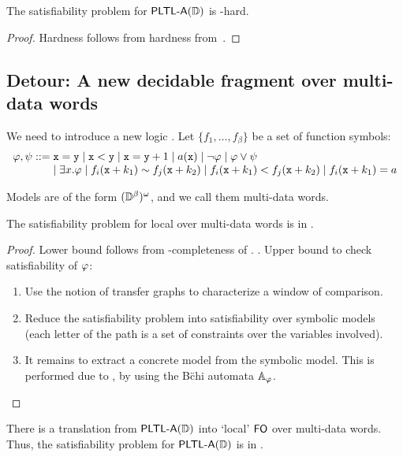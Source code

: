 \begin{theorem}
 The satisfiability problem for ${\rm\textsf{PLTL-A}}(\mathbb{D})$ is \tower-hard.
\end{theorem}

\begin{proof}
Hardness follows from hardness from~.

\end{proof}

\subsection{Detour: A new decidable \FOL fragment over multi-data words} 

We need to introduce a new logic . Let $\{f_1,\dots,f_\beta\}$ be a set of function symbols:
\[
\begin{array}{l@{\;}l}
    \aformula, \aformulabis ::= & \avar = \avarbis \mid \avar < \avarbis \mid \avar = \avarbis + 1 \mid a(\avar) \mid \neg\aformula \mid \aformula \vee \aformulabis \\ 
    & \mid \exists x.\varphi \mid f_i(\avar + k_1) \sim f_j(\avar+k_2) \mid f_i(\avar + k_1) < f_j(\avar+k_2) \mid f_i(\avar + k_1) = a
\end{array}
\]

Models are of the form $(\mathbb{D}^\beta)^\omega$, and we call them multi-data words. 

\begin{theorem}
 The satisfiability problem for local \FOL over multi-data words is in \tower.
\end{theorem}

\begin{proof}
Lower bound follows from \tower-completeness of \FOL. . Upper bound to check satisfiability of $\varphi$: 
\begin{enumerate}
    \item Use the notion of transfer graphs to characterize a window of comparison.
    \item Reduce the satisfiability problem into satisfiability over symbolic models (each letter of the path is a set of constraints over the variables involved).
    \item It remains to extract a concrete model from the symbolic model. This is performed due to \cite{Demri&Quaas2023}, by using the B\"chi automata $\mathbb{A}_\varphi$.
\end{enumerate}
\end{proof}

\begin{conjecture}
    There is a translation from ${\rm\textsf{PLTL-A}}(\mathbb{D})$ into `local' ${\rm\textsf{FO}}$ over multi-data words. Thus, the satisfiability problem for ${\rm\textsf{PLTL-A}}(\mathbb{D})$ is in \tower.
\end{conjecture}
